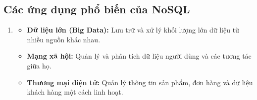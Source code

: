 \subsection{Các ứng dụng phổ biến của NoSQL}
\begin{enumerate}[left=1cm]
    \item[] 
    \begin{itemize}
    \item [$\bullet$]\textbf{Dữ liệu lớn (Big Data):} Lưu trữ và xử lý khối lượng lớn dữ liệu từ nhiều nguồn khác nhau.
    
    \item [$\bullet$]\textbf{Mạng xã hội:} Quản lý và phân tích dữ liệu người dùng và các tương tác giữa họ.
    
    \item [$\bullet$]\textbf{Thương mại điện tử:} Quản lý thông tin sản phẩm, đơn hàng và dữ liệu khách hàng một cách linh hoạt.
    \end{itemize}
    

\end{enumerate}